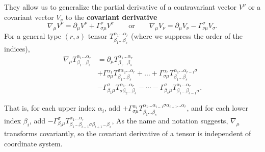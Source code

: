 They allow us to generalize the partial derivative of a contravariant vector $V^\nu$ or a covariant vector $V_\nu$ to the \textbf{covariant derivative}
\begin{equation*}
	\nabla_\mu V^\nu = \partial_\mu V^\nu + \Gamma_{\sigma \mu}^\nu V^\sigma
	\qquad \text{or} \qquad
	\nabla_\mu V_\nu = \partial_\mu V_\nu - \Gamma_{\nu \mu}^\sigma V_\sigma
	.
\end{equation*}
For a general type $(r,s)$ tensor $T^{\alpha_1 \ldots \alpha_r}_{\beta_1 \ldots \beta_s}$ (where we suppress the order of the indices),
\begin{equation}
\begin{split}
	\nabla_\mu T^{\alpha_1 \ldots \alpha_r}_{\beta_1 \ldots \beta_s} &= \partial_\mu T^{\alpha_1 \ldots \alpha_r}_{\beta_1 \ldots \beta_s} \\
	                                                                 &+ \Gamma^{\alpha_1}_{\sigma\mu} T^{\sigma \alpha_2 \ldots \alpha_r}_{\beta_1 \ldots \beta_s} + \dots + \Gamma^{\alpha_r}_{\sigma\mu} T^{\alpha_1 \ldots \alpha_{r-1}\sigma}_{\beta_1 \ldots \beta_s} \\
	                                                                 &- \Gamma^\sigma_{\beta_1 \mu} T^{\alpha_1 \ldots \alpha_r}_{\sigma \beta_2 \ldots \beta_s} - \cdots - \Gamma^\sigma_{\beta_s \mu} T^{\alpha_1 \ldots \alpha_r}_{\beta_1 \ldots \beta_{s-1} \sigma}.
	\label{eq:def_cov_deriv}
\end{split}
\end{equation}
\iffalse
\begin{align}
	\nabla_c T\indices{^{a_1 \ldots a_r}_{b_1 \ldots b_s}} &= \partial_c {T^{a_1 \ldots a_r}}_{b_1 \ldots b_s} \\
	                                                       &+ \Gamma^{a_1}_{dc} T\indices{^{d a_2 \ldots a_r}_{b_1 \ldots b_s}} + \dots + \Gamma^{a_r}_{dc} T\indices{^{a_1 \ldots a_{r-1}d}_{b_1 \ldots b_s}} \\
	                                                       &- {\Gamma^d}_{b_1 c} {T^{a_1 \ldots a_r}}_{d b_2 \ldots b_s} - \cdots - {\Gamma^d}_{b_s c} {T^{a_1 \ldots a_r}}_{b_1 \ldots b_{s-1} d}.
	\label{eq:def_cov_deriv}
\end{align}
\fi
That is, for each upper index $\alpha_i$, add $+\Gamma^{\alpha_i}_{\sigma \mu} T^{\alpha_1 \ldots \alpha_{i-1} \sigma \alpha_{i+1} \ldots \alpha_r}_{\beta_1 \ldots \beta_s}$,
and for each lower index $\beta_i$, add $-\Gamma^{\sigma}_{\beta_i \mu} T^{\alpha_1 \ldots \alpha_r}_{\beta_1 \ldots \beta_{i-1} \sigma \beta_{i+1} \ldots \beta_s}$,
As the name and notation suggests, $\nabla_\mu$ transforms covariantly, so the covariant derivative of a tensor is independent of coordinate system.

